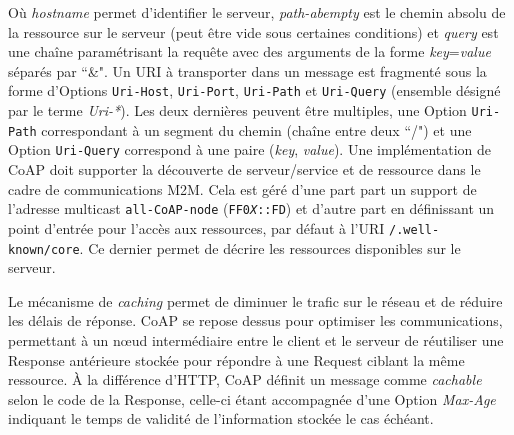 \documentclass[]{report}
\begin{document}
\par Où \textit{hostname} permet d'identifier le serveur, \textit{path-abempty} est le chemin absolu de la ressource sur le serveur (peut être vide sous certaines conditions) et \textit{query} est une chaîne paramétrisant la requête avec des arguments de la forme \textit{key}=\textit{value} séparés par ``\&". Un URI à transporter dans un message est fragmenté sous la forme d'Options \texttt{Uri-Host}, \texttt{Uri-Port}, \texttt{Uri-Path} et \texttt{Uri-Query} (ensemble désigné par le terme \textit{Uri-*}). Les deux dernières peuvent être multiples, une Option \texttt{Uri-Path} correspondant à un segment du chemin (chaîne entre deux ``/") et une Option \texttt{Uri-Query} correspond à une paire (\textit{key}, \textit{value}). Une implémentation de CoAP doit supporter la découverte de serveur/service et de ressource dans le cadre de communications M2M. Cela est géré d'une part part un support de l'adresse multicast \texttt{all-CoAP-node} (\texttt{FF0\textit{X}::FD}) et d'autre part en définissant un point d'entrée pour l'accès aux ressources, par défaut à l'URI \texttt{/.well-known/core}. Ce dernier permet de décrire les ressources disponibles sur le serveur.\\

\vspace{0.4cm}

\par Le mécanisme de \textit{caching} permet de diminuer le trafic sur le réseau et de réduire les délais de réponse. CoAP se repose dessus pour optimiser les communications, permettant à un nœud intermédiaire entre le client et le serveur de réutiliser une Response antérieure stockée pour répondre à une Request ciblant la même ressource. À la différence d'HTTP, CoAP définit un message comme \textit{cachable} selon le code de la Response, celle-ci étant accompagnée d'une Option \textit{Max-Age} indiquant le temps de validité de l'information stockée le cas échéant.\\
\end{document}
